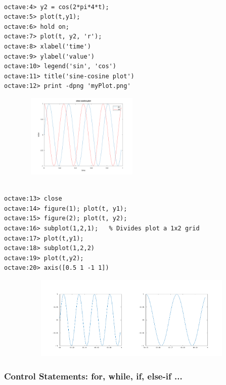 \documentclass[12pt]{report}
\begin{document}
\begin{lstlisting}[basicstyle=\small]

octave:4> y2 = cos(2*pi*4*t);
octave:5> plot(t,y1);
octave:6> hold on;
octave:7> plot(t, y2, 'r');
octave:8> xlabel('time')
octave:9> ylabel('value')
octave:10> legend('sin', 'cos')
octave:11> title('sine-cosine plot')
octave:12> print -dpng 'myPlot.png'
\end{lstlisting}

\begin{figure}[h]
  \includegraphics[width=6cm, height=4cm]{myPlot.png}
\end{figure}

\begin{lstlisting}[basicstyle=\small]

octave:13> close
octave:14> figure(1); plot(t, y1);
octave:15> figure(2); plot(t, y2);
octave:16> subplot(1,2,1);   % Divides plot a 1x2 grid
octave:17> plot(t,y1);
octave:18> subplot(1,2,2)
octave:19> plot(t,y2);
octave:20> axis([0.5 1 -1 1])
\end{lstlisting}

\begin{figure}[h]
  \includegraphics[width=12cm, height=4cm]{plot2.png}
\end{figure}

\vspace{5mm}
\subsubsection{Control Statements: for, while, if, else-if ...}
\end{document}

